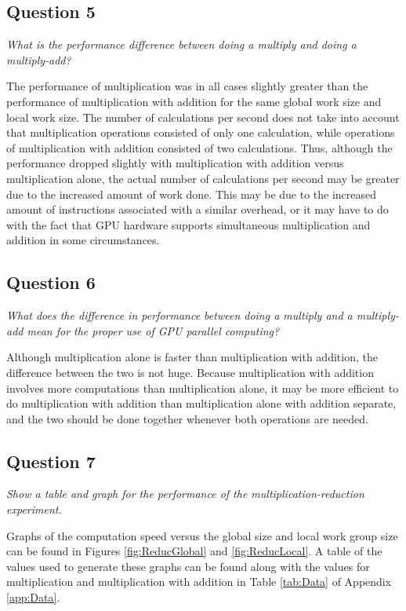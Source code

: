 \documentclass{article}
\begin{document}
\subsection*{Question 5}
\textit{What is the performance difference between doing a multiply and doing a multiply-add?}

The performance of multiplication was in all cases slightly greater than the performance of multiplication with addition for the same global work size and local work size.  The number of calculations per second does not take into account that multiplication operations consisted of only one calculation, while operations of multiplication with addition consisted of two calculations.  Thus, although the performance dropped slightly with multiplication with addition versus multiplication alone, the actual number of calculations per second may be greater due to the increased amount of work done.  This may be due to the increased amount of instructions associated with a similar overhead, or it may have to do with the fact that GPU hardware supports simultaneous multiplication and addition in some circumstances.

\subsection*{Question 6}
\textit{What does the difference in performance between doing a multiply and a multiply-add mean for the proper use of GPU parallel computing?}

Although multiplication alone is faster than multiplication with addition, the difference between the two is not huge.  Because multiplication with addition involves more computations than multiplication alone, it may be more efficient to do multiplication with addition than multiplication alone with addition separate, and the two should be done together whenever both operations are needed.

\newpage
\subsection*{Question 7}
\textit{Show a table and graph for the performance of the multiplication-reduction experiment.}

Graphs of the computation speed versus the global size and local work group size can be found in Figures \ref{fig:ReducGlobal} and \ref{fig:ReducLocal}.  A table of the values used to generate these graphs can be found along with the values for multiplication and multiplication with addition in Table \ref{tab:Data} of Appendix \ref{app:Data}.
\end{document}
